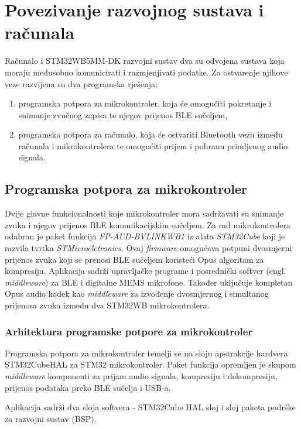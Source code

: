 \chapter{Povezivanje razvojnog sustava i računala}

Računalo i STM32WB5MM-DK razvojni sustav dva su odvojena sustava koja moraju međusobno komunicirati i razmjenjivati podatke. Za ostvarenje njihove veze razvijena su dva programska rješenja:
\begin{enumerate}
	\item programska potpora za mikrokontroler, koja će omogućiti pokretanje i snimanje zvučnog zapisa te njegov prijenos BLE sučeljem,
	\item programska potpora za računalo, koja će ostvariti Bluetooth vezu između računala i mikrokontrolera te omogućiti prijem i pohranu primljenog audio signala.
\end{enumerate} 

\section{Programska potpora za mikrokontroler}

Dvije glavne funkcionalnosti koje mikrokontroler mora sadržavati su snimanje zvuka i njegov prijenos BLE komunikacijskim sučeljem. Za rad mikrokontrolera odabran je paket funkcija \textit{FP-AUD-BVLINKWB1} iz alata \textit{STM32Cube} koji je razvila tvrtka \textit{STMicroeletronics}. Ovaj \textit{firmware} omogućava potpuni dvosmjerni prijenos zvuka koji se prenosi BLE sučeljem koristeći Opus algoritam za kompresiju. Aplikacija sadrži upravljačke programe i posrednički softver (engl. \textit{middleware}) za BLE i digitalne MEMS mikrofone. Također uključuje kompletan Opus audio kodek kao \textit{middleware} za izvođenje dvosmjernog i simultanog prijenosa zvuka između dva STM32WB mikrokontrolera. 

\subsection{Arhitektura programske potpore za mikrokontroler}

Programska potpora za mikrokontroler temelji se na sloju apstrakcije hardvera STM32CubeHAL za STM32 mikrokontroler. Paket funkcija opremljen je skupom \textit{middleware} komponenti za prijam audio signala, kompresiju i
dekompresiju, prijenos podataka preko BLE sučelja i USB-a.

Aplikacija sadrži dva sloja softvera - STM32Cube HAL sloj i sloj paketa podrške za razvojni sustav (BSP).

